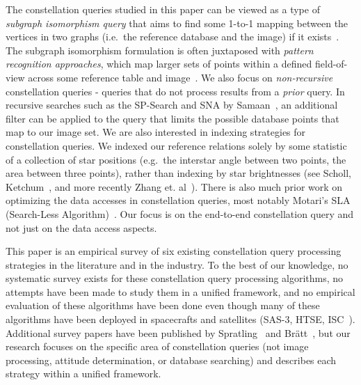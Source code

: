 The constellation queries studied in this paper can be viewed as a type of \emph{subgraph isomorphism query} that aims to find some 1-to-1 mapping between the vertices in two graphs (i.e.\ the reference database and the image) if it exists~\cite{scott:graphIsomorphismProblem}.
The subgraph isomorphism formulation is often juxtaposed with \emph{pattern recognition approaches}, which map larger sets of points within a defined field-of-view across some reference table and image~\cite{padgett:gridAlgorithm}.
We also focus on \emph{non-recursive} constellation queries - queries that do not process results from a \emph{prior} query.
In recursive searches such as the SP-Search and SNA by Samaan~\cite{samaan:recursiveMode}, an additional filter can be applied to the query that limits the possible database points that map to our image set.
We are also interested in indexing strategies for constellation queries.
We indexed our reference relations solely by some statistic of a collection of star positions (e.g.\ the interstar angle between two points, the area between three points), rather than indexing by star brightnesses (see Scholl\cite{scholl:starFieldIdentification}, Ketchum~\cite{ketchum:onboardStarIdentification}, and more recently Zhang et. al~\cite{zhang:brightnessReferenced}).
There is also much prior work on optimizing the data accesses in constellation queries, most notably Motari's SLA (Search-Less Algorithm)~\cite{mortari:kVectorApproach}.
Our focus is on the end-to-end constellation query and not just on the data access aspects.

This paper is an empirical survey of six existing constellation query processing strategies in the literature and in the industry.
To the best of our knowledge, no systematic survey exists for these constellation query processing algorithms, no attempts have been made to study them in a unified framework, and no empirical evaluation of these algorithms have been done even though many of these algorithms have been deployed in spacecrafts and satellites (SAS-3, HTSE, ISC~\cite{gottlieb:spacecraftAttitudeDetermination,mortari:pyramidIdentification}).
Additional survey papers have been published by Spratling~\cite{spratling:surveyStarIdentification} and
Br\"{a}tt~\cite{bratt:analysisStarIdentification}, but our research focuses on the specific area of constellation queries (not image processing, attitude determination, or database searching) and describes each strategy within a unified framework.

